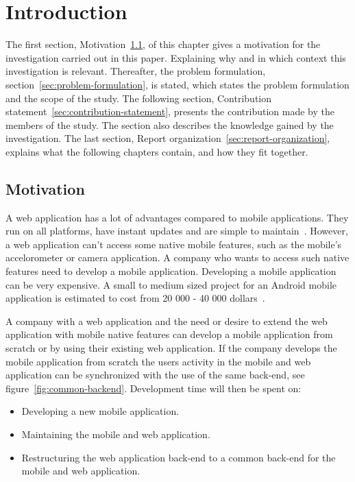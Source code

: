\chapter{Introduction}\label{ch:introduction}
The first section, Motivation~\ref{sec:motivation}, of this chapter gives a motivation for the investigation carried out in this paper. Explaining why and in which context this investigation is relevant. Thereafter, the problem formulation, section~\ref{sec:problem-formulation}, is stated, which states the problem formulation and the scope of the study. The following section, Contribution statement~\ref{sec:contribution-statement}, presents the contribution made by the members of the study. The section also describes the knowledge gained by the investigation. The last section, Report organization~\ref{sec:report-organization}, explains what the following chapters contain, and how they fit together.

\section{Motivation}\label{sec:motivation}
A web application has a lot of advantages compared to mobile applications. They run on all platforms, have instant updates and are simple to maintain~\cite{michaels2013}. However, a web application can't access some native mobile features, such as the mobile's accelorometer or camera application. A company who wants to access such native features need to develop a mobile application. Developing a mobile application can be very expensive. A small to medium sized project for an Android mobile application is estimated to cost from 20 000 - 40 000 dollars~\cite{kohan2015}.

A company with a web application and the need or desire to extend the web application with mobile native features can develop a mobile application from scratch or by using their existing web application. If the company develops the mobile application from scratch the users activity in the mobile and web application can be synchronized with the use of the same back-end, see figure~\ref{fig:common-backend}. Development time will then be spent on:
\begin{itemize}
\item Developing a new mobile application.
\item Maintaining the mobile and web application.
\item Restructuring the web application back-end to a common back-end for the mobile and web application.
\end{itemize}

